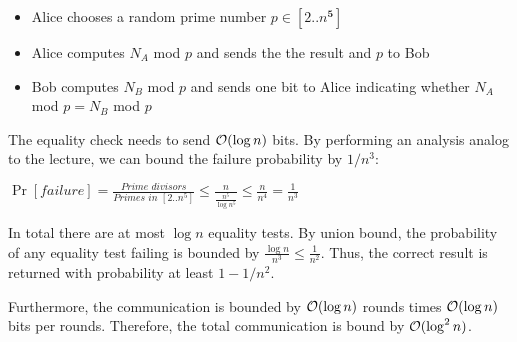 \begin{itemize}
    \item Alice chooses a random prime number $p \in [2..n^\textbf{5}]$
    \item Alice computes $N_A$ mod $p$ and sends the the result and $p$ to Bob
    \item Bob computes $N_B$ mod $p$ and sends one bit to Alice indicating whether $N_A$ mod $p = N_B$ mod $p$
\end{itemize}

The equality check needs to send $\mathcal{O}(\log n)$ bits.
By performing an analysis analog to the lecture, we can bound the failure probability by $1/n^3$:

$\Pr[\textit{failure}] = \frac{\textit{Prime divisors}}{\textit{Primes in }[2..n^5]} \leq \frac{n}{\frac{n^5}{\log n^5}} \leq \frac{n}{n^4} = \frac{1}{n^3}$

In total there are at most $\log n$ equality tests. By union bound, the probability of any equality test failing is bounded by $\frac{\log n}{n^3} \leq \frac{1}{n^2}$. Thus, the correct result is returned with probability at least $1 - 1/n^2$. 

Furthermore, the communication is bounded by $\mathcal{O}(\log n)$ rounds times $\mathcal{O}(\log n)$ bits per rounds. Therefore, the total communication is bound by $\mathcal{O}(\log^2 n)$.

\pagebreak

